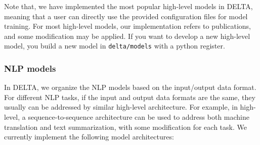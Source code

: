 \documentclass{article}
\begin{document}
Note that, we have implemented the most popular high-level models in DELTA, meaning that a user can directly use the provided configuration files for model training. For most high-level models, our implementation refers to publications, and some modification may be applied. If you want to develop a new high-level model, you build a new model in \texttt{delta/models} with a python register.

\subsubsection{NLP models}
In DELTA, we organize the NLP models based on the input/output data format. For different NLP tasks, if the input and output data formats are the same, they usually can be addressed by similar high-level architecture. For example, in high-level, a sequence-to-sequence architecture can be used to address both machine translation and text summarization, with some modification for each task. We currently implement the following model architectures:
\end{document}

